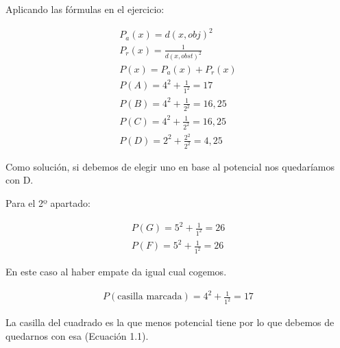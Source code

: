 Aplicando las fórmulas en el ejercicio:

\begin{align*}
    P_a(x) = d(x,obj)^2 \\
    P_r(x) = \frac{1}{d(x,obst)^2} \\
    P(x) = P_a(x)+P_r(x) \\
    P(A) = 4^2 +  \frac{1}{1^2} = 17\\
    P(B) = 4^2 + \frac{1}{2^2} = 16,25\\
    P(C) = 4^2 + \frac{1}{2^2} = 16,25\\
    P(D) = 2^2 + \frac{2^2}{2^2} = 4,25
\end{align*}

Como solución, si debemos de elegir uno en base al potencial nos quedaríamos con D.

Para el 2º apartado:

\begin{align*}
    P(G) = 5^2+ \frac{1}{1^2} = 26 \\
    P(F) = 5^2+ \frac{1}{1^2} = 26
\end{align*}

En este caso al haber empate da igual cual cogemos.

\begin{align}
    P(\text{casilla marcada}) = 4^2 + \frac{1}{1^2} = 17
\end{align}

La casilla del cuadrado es la que menos potencial tiene por lo que debemos de quedarnos con esa (Ecuación 1.1).

